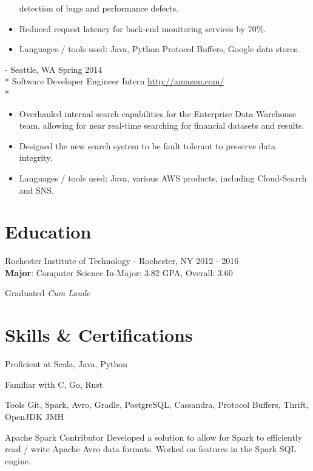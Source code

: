 \documentclass[overlapped,line]{resume}
\newcommand{\rurl}[1]{\hfill {\footnotesize \url{#1}}}
\newcommand{\rdate}[1]{\hfill {\small #1}}
\renewcommand{\employer}[5]{ \item[#1] - #2 \rdate{#3} \\* #4 \rurl{#5} \\* \vspace{-5mm}}
\begin{document}
\begin{resume}
\begin{asparadesc}
\begin{itemize}
        detection of bugs and performance defects.
      \item Reduced request latency for back-end monitoring services by 70\%.
      \item Languages / tools used: Java, Python Protocol Buffers, Google data stores.
    \end{itemize}
    \employer{Amazon}{Seattle, WA}{Spring 2014}{Software Developer Engineer
      Intern}{http://amazon.com/}
    \begin{itemize}
      \item Overhauled internal search capabilities for the Enterprise Data Warehouse team, allowing
        for near real-time searching for financial datasets and results.
      \item Designed the new search system to be fault tolerant to preserve data integrity.
      \item Languages / tools used: Java, various AWS products, including Cloud-Search and SNS.
    \end{itemize}
  \end{asparadesc}

\section{\mysidestyle Education}

  \begin{compactdesc}
    \item[Rochester Institute of Technology] - Rochester, NY \hfill {2012 - 2016} \\
      \textbf{Major}: Computer Science \hfill {In-Major: 3.82 GPA, Overall: 3.60} \\
      \vspace{-4mm}
      \begin{flushright} Graduated \textit{Cum Laude} \end{flushright}
  \end{compactdesc}
  \vspace{-6mm}
  
\section{\mysidestyle Skills \& Certifications}

  \begin{compactdesc}
  \item[Proficient at] \small Scala, Java, Python
  \item[Familiar with] \small C, Go, Rust
  \item[Tools] \small Git, Spark, Avro, Gradle, PostgreSQL, Cassandra, Protocol Buffers, Thrift,
    OpenJDK JMH
  \item[Apache Spark Contributor] Developed a solution to allow for Spark to efficiently read /
    write Apache Avro data formats. Worked on features in the Spark SQL engine.
  \end{compactdesc}



\end{resume}
\end{document}
